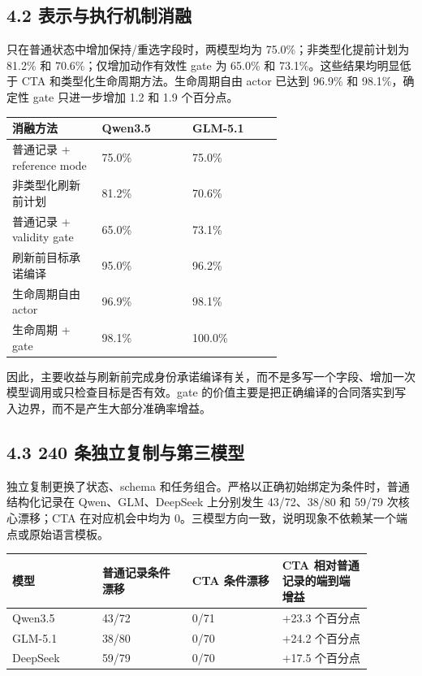 \documentclass[10.5pt,fontset=none]{ctexart}
\begin{document}
\subsection{4.2 表示与执行机制消融}
\par 只在普通状态中增加保持/重选字段时，两模型均为 75.0\%；非类型化提前计划为 81.2\% 和 70.6\%；仅增加动作有效性 gate 为 65.0\% 和 73.1\%。这些结果均明显低于 CTA 和类型化生命周期方法。生命周期自由 actor 已达到 96.9\% 和 98.1\%，确定性 gate 只进一步增加 1.2 和 1.9 个百分点。
\begin{longtable}{@{}p{0.220\linewidth} p{0.220\linewidth} p{0.220\linewidth}@{}}
\toprule
消融方法 & Qwen3.5 & GLM-5.1 \\
\midrule\endhead
普通记录 + reference mode & 75.0\% & 75.0\% \\
非类型化刷新前计划 & 81.2\% & 70.6\% \\
普通记录 + validity gate & 65.0\% & 73.1\% \\
刷新前目标承诺编译 & 95.0\% & 96.2\% \\
生命周期自由 actor & 96.9\% & 98.1\% \\
生命周期 + gate & 98.1\% & 100.0\% \\
\bottomrule
\end{longtable}

\par 因此，主要收益与刷新前完成身份承诺编译有关，而不是多写一个字段、增加一次模型调用或只检查目标是否有效。gate 的价值主要是把正确编译的合同落实到写入边界，而不是产生大部分准确率增益。
\subsection{4.3 240 条独立复制与第三模型}
\par 独立复制更换了状态、schema 和任务组合。严格以正确初始绑定为条件时，普通结构化记录在 Qwen、GLM、DeepSeek 上分别发生 43/72、38/80 和 59/79 次核心漂移；CTA 在对应机会中均为 0。三模型方向一致，说明现象不依赖某一个端点或原始语言模板。
\begin{longtable}{@{}p{0.220\linewidth} p{0.220\linewidth} p{0.220\linewidth} p{0.220\linewidth}@{}}
\toprule
模型 & 普通记录条件漂移 & CTA 条件漂移 & CTA 相对普通记录的端到端增益 \\
\midrule\endhead
Qwen3.5 & 43/72 & 0/71 & +23.3 个百分点 \\
GLM-5.1 & 38/80 & 0/70 & +24.2 个百分点 \\
DeepSeek & 59/79 & 0/70 & +17.5 个百分点 \\
\bottomrule
\end{longtable}
\end{document}
